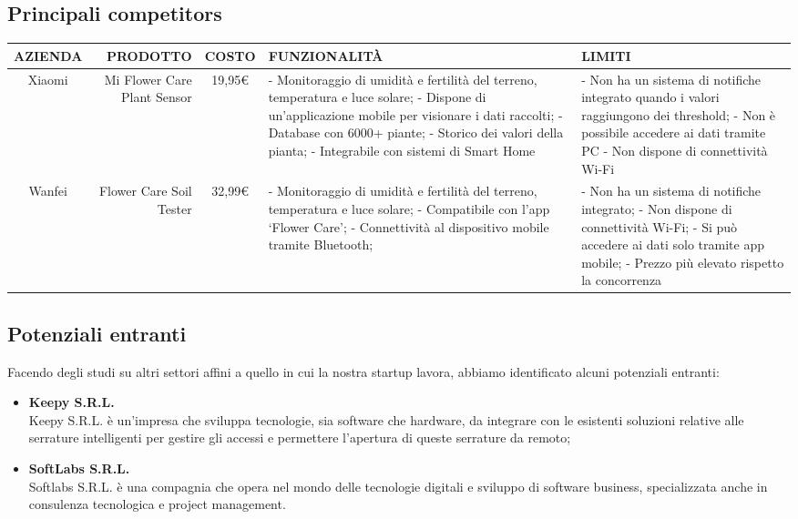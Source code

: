 \subsection{Principali competitors}
\begin{center}
\begin{tabularx}{\textwidth}{| S | D | S | L | L |}
  \hline
  \textbf{AZIENDA} &
  \textbf{PRODOTTO} &
  \textbf{COSTO} &
  \textbf{FUNZIONALIT\`A} &
  \textbf{LIMITI} \\	
  \hline
 Xiaomi & Mi Flower Care Plant Sensor & 19,95€ &
- Monitoraggio di umidità e fertilità del terreno, temperatura e luce solare;\newline
- Dispone di un’applicazione mobile per visionare i dati raccolti;\newline
- Database con 6000+ piante;\newline
- Storico dei valori della pianta;\newline
- Integrabile con sistemi di Smart Home & 
- Non ha un sistema di notifiche integrato quando i valori raggiungono dei threshold;\newline
- Non è possibile accedere ai dati tramite PC\newline
- Non dispone di connettività Wi-Fi \\	\hline
 Wanfei & Flower Care Soil Tester & 32,99€ &
- Monitoraggio di umidità e fertilità del terreno, temperatura e luce solare;\newline
- Compatibile con l’app ‘Flower Care’;\newline
- Connettività al dispositivo mobile tramite Bluetooth; &
- Non ha un sistema di notifiche integrato;\newline
- Non dispone di connettività Wi-Fi;\newline
- Si può accedere ai dati solo tramite app mobile;\newline
- Prezzo più elevato rispetto la concorrenza \\	\hline
\end{tabularx}
\end{center}

\subsection{Potenziali entranti}

Facendo degli studi su altri settori affini a quello in cui la nostra startup lavora, abbiamo identificato alcuni potenziali entranti:
\begin{itemize}
	\item \textbf{Keepy S.R.L.}\\
	Keepy S.R.L. è un’impresa che sviluppa tecnologie, sia software che hardware, da integrare con le esistenti soluzioni relative alle serrature intelligenti per gestire gli accessi e permettere l’apertura di queste serrature da remoto;
	\item \textbf{SoftLabs S.R.L.}\\
	Softlabs S.R.L. è una compagnia che opera nel mondo delle tecnologie digitali e sviluppo di software business, specializzata anche in consulenza tecnologica e project management. 
\end{itemize}

